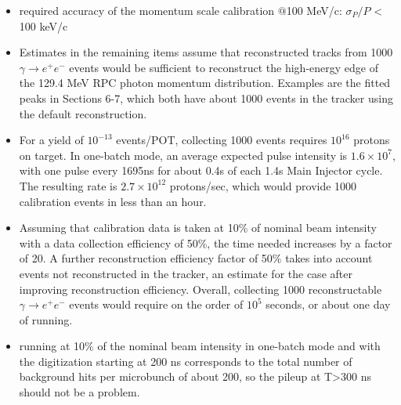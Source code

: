 \begin{itemize}
\item 
  required accuracy of the momentum scale calibration $@$100 MeV/c: $\sigma_P/P$ < 100 keV/c
\item
Estimates in the remaining items assume that reconstructed tracks from 1000 $ \gamma \to e^+ e^- $ events would be sufficient to reconstruct the high-energy edge of the 129.4 MeV RPC photon momentum distribution. Examples are the fitted peaks in Sections 6-7, which both have about 1000 events in the tracker using the default reconstruction.  
\item
For a yield of $10^{-13}$ events/POT, collecting 1000 events requires $10^{16}$ protons on target.
  In one-batch mode, an average expected pulse intensity is $1.6 \times 10^7$, with one pulse every 1695ns for about 0.4s of each 1.4s Main Injector cycle. The resulting rate is $2.7 \times 10^{12}$ protons/sec, which would provide 1000 calibration events in less than an hour.
\item
  Assuming that calibration data is taken at 10\% of nominal beam intensity with a data collection efficiency of 50\%, the time needed increases by a factor of 20. A further reconstruction efficiency factor of 50\% takes into account events not reconstructed in the tracker, an estimate for the case after improving reconstruction efficiency. Overall, collecting 1000 reconstructable $ \gamma \to e^+ e^- $ events would require on the order of $10^5$ seconds, or about one day of running.
\item
  running at 10\% of the nominal beam intensity in one-batch mode and with the digitization starting
  at 200 ns corresponds to the total number of background hits per microbunch of about 200,
  so the pileup at T>300 ns should not be a problem.
\end{itemize}


